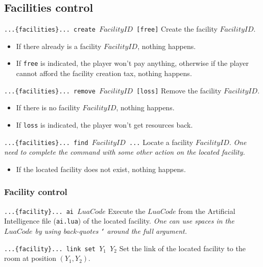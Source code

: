 \documentclass[10pt,a4paper]{scrartcl}
\newenvironment{apiCode}[1]
{ \begin{lrbox}{\mybox} \begin{minipage}{0.9\textwidth} {\color{Mahogany} \small\texttt{#1}} \vspace{8pt} \newline }
{ \end{minipage} \end{lrbox}\fbox{\usebox{\mybox}} \newline\vspace{4pt}\newline }
\begin{document}
\subsection{Facilities control}
\begin{apiCode}{...\{facilities\}... create $FacilityID$ [free]}
Create the facility $FacilityID$.
\begin{itemize}
\itemsep 0em
\item If there already is a facility $FacilityID$, nothing happens.
\item If \verb#free# is indicated, the player won't pay anything,\newline
	  otherwise if the player cannot afford the facility creation tax, nothing happens.
\end{itemize}
\end{apiCode}
\begin{apiCode}{...\{facilities\}... remove $FacilityID$ [loss]}
Remove the facility $FacilityID$.
\begin{itemize}
\itemsep 0em
\item If there is no facility $FacilityID$, nothing happens.
\item If \verb#loss# is indicated, the player won't get resources back.
\end{itemize}
\end{apiCode}
\begin{apiCode}{...\{facilities\}... find $FacilityID$ ...}
Locate a facility $FacilityID$.\newline
\textit{One need to complete the command with some other action on the located facility.}
\begin{itemize}
\itemsep 0em
\item If the located facility does not exist, nothing happens.
\end{itemize}
\end{apiCode}

\subsubsection*{Facility control}
\begin{apiCode}{...\{facility\}... ai $LuaCode$}
Execute the $LuaCode$ from the Artificial Intelligence file (\texttt{ai.lua}) of the located facility.\newline
\textit{One can use spaces in the $LuaCode$ by using back-quotes \texttt{`} around the full argument.}
\end{apiCode}
\begin{apiCode}{...\{facility\}... link set $Y_1$ $Y_2$}
Set the link of the located facility to the room at position $(Y_1, Y_2)$.
\end{apiCode}
\end{document}
